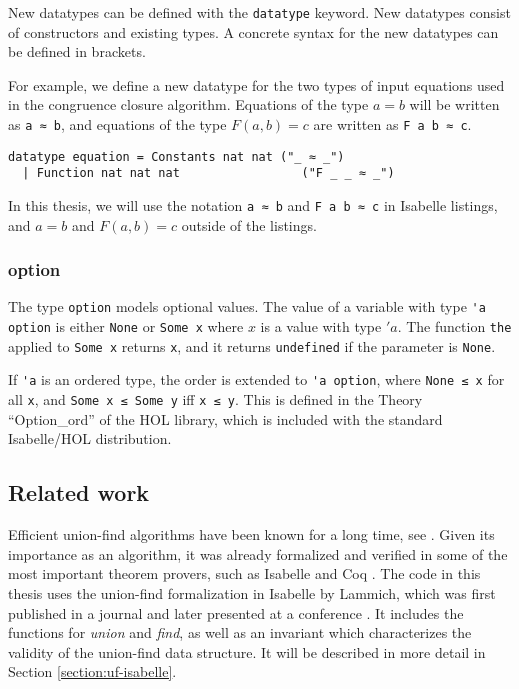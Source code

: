 New datatypes can be defined with the \lstinline|datatype| keyword. New datatypes consist of constructors and existing types. A concrete syntax for the new datatypes can be defined in brackets.

For example, we define a new datatype for the two types of input equations used in the congruence closure algorithm. Equations of the type $a = b$ will be written as \lstinline{a ≈ b}, and equations of the type $F(a, b) = c$ are written as \lstinline{F a b ≈ c}.

\begin{lstlisting}
datatype equation = Constants nat nat ("_ ≈ _")
  | Function nat nat nat                 ("F _ _ ≈ _")
\end{lstlisting}

In this thesis, we will use the notation \lstinline{a ≈ b} and \lstinline{F a b ≈ c} in Isabelle listings, and $a = b$ and $F(a, b) = c$ outside of the listings.

\subsubsection{option}

The type \lstinline{option} models optional values. The value of a variable with type \lstinline{'a option} is either \lstinline|None| or \lstinline|Some x| where $x$ is a value with type $'a$. The function \lstinline|the| applied to \lstinline|Some x| returns \lstinline|x|, and it returns \lstinline|undefined| if the parameter is \lstinline|None|.

If \lstinline{'a} is an ordered type, the order is extended to \lstinline{'a option}, where \lstinline{None ≤ x} for all \lstinline|x|, and \lstinline{Some x ≤ Some y} iff \lstinline{x ≤ y}. This is defined in the Theory ``Option\_ord'' of the HOL library, which is included with the standard Isabelle/HOL distribution.

\subsection{Related work}

Efficient union-find algorithms have been known for a long time, see \cite{unionfind-og, Tarjan}. Given its importance as an algorithm, it was already formalized and verified in some of the most important theorem provers, such as Isabelle and Coq \cite{unionfind-persistent}. The code in this thesis uses the union-find formalization in Isabelle by Lammich, which was first published in a journal \cite{unionfind-isabelle} and later presented at a conference \cite{unionfind-isabelle-conference}. It includes the functions for \emph{union} and \emph{find}, as well as an invariant which characterizes the validity of the union-find data structure. It will be described in more detail in Section \ref{section:uf-isabelle}.


